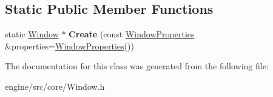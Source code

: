 \subsection*{Static Public Member Functions}
\begin{DoxyCompactItemize}
\item 
\mbox{\label{classengine_1_1Window_a325de6424cfdd7fb58c05679e595008a}} 
static \hyperlink{classengine_1_1Window}{Window} $\ast$ {\bfseries Create} (const \hyperlink{structengine_1_1WindowProperties}{Window\+Properties} \&properties=\hyperlink{structengine_1_1WindowProperties}{Window\+Properties}())
\end{DoxyCompactItemize}


The documentation for this class was generated from the following file\+:\begin{DoxyCompactItemize}
\item 
engine/src/core/Window.\+h\end{DoxyCompactItemize}
